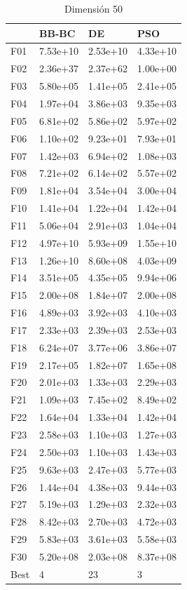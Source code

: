 \begin{table}[H]
    \begin{minipage}{.5\linewidth}
      \caption{Dimensión 50}
      \centering
      \begin{tabular}{llll}
        \toprule
        {} &     BB-BC &        DE &       PSO \\
        \midrule
        F01  &  7.53e+10 &  2.53e+10 &  4.33e+10 \\
        F02  &  2.36e+37 &  2.37e+62 &  1.00e+00 \\
        F03  &  5.80e+05 &  1.41e+05 &  2.41e+05 \\
        F04  &  1.97e+04 &  3.86e+03 &  9.35e+03 \\
        F05  &  6.81e+02 &  5.86e+02 &  5.97e+02 \\
        F06  &  1.10e+02 &  9.23e+01 &  7.93e+01 \\
        F07  &  1.42e+03 &  6.94e+02 &  1.08e+03 \\
        F08  &  7.21e+02 &  6.14e+02 &  5.57e+02 \\
        F09  &  1.81e+04 &  3.54e+04 &  3.00e+04 \\
        F10  &  1.41e+04 &  1.22e+04 &  1.42e+04 \\
        F11  &  5.06e+04 &  2.91e+03 &  1.04e+04 \\
        F12  &  4.97e+10 &  5.93e+09 &  1.55e+10 \\
        F13  &  1.26e+10 &  8.60e+08 &  4.03e+09 \\
        F14  &  3.51e+05 &  4.35e+05 &  9.94e+06 \\
        F15  &  2.00e+08 &  1.84e+07 &  2.00e+08 \\
        F16  &  4.89e+03 &  3.92e+03 &  4.10e+03 \\
        F17  &  2.33e+03 &  2.39e+03 &  2.53e+03 \\
        F18  &  6.24e+07 &  3.77e+06 &  3.86e+07 \\
        F19  &  2.17e+05 &  1.82e+07 &  1.65e+08 \\
        F20  &  2.01e+03 &  1.33e+03 &  2.29e+03 \\
        F21  &  1.09e+03 &  7.45e+02 &  8.49e+02 \\
        F22  &  1.64e+04 &  1.33e+04 &  1.42e+04 \\
        F23  &  2.58e+03 &  1.10e+03 &  1.27e+03 \\
        F24  &  2.50e+03 &  1.10e+03 &  1.43e+03 \\
        F25  &  9.63e+03 &  2.47e+03 &  5.77e+03 \\
        F26  &  1.44e+04 &  4.38e+03 &  9.44e+03 \\
        F27  &  5.19e+03 &  1.29e+03 &  2.32e+03 \\
        F28  &  8.42e+03 &  2.70e+03 &  4.72e+03 \\
        F29  &  5.83e+03 &  3.61e+03 &  5.58e+03 \\
        F30  &  5.20e+08 &  2.03e+08 &  8.37e+08 \\
        Best &         4 &        23 &         3 \\
        \bottomrule
        \end{tabular}
        

\end{minipage}
\end{table}
